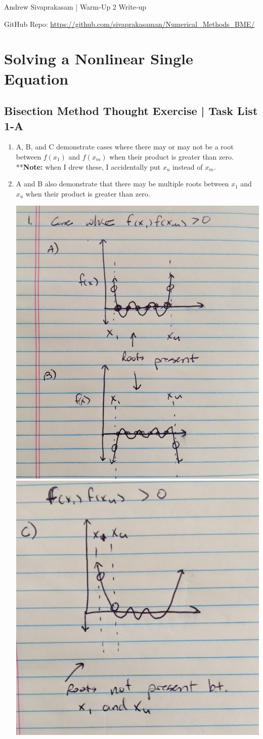 \documentclass[12pt]{extarticle}
\begin{document}
{\Large Andrew Sivaprakasam | Warm-Up 2 Write-up}

GitHub Repo: \url{https://github.com/sivaprakasaman/Numerical_Methods_BME/} 

\section{Solving a Nonlinear Single Equation}


\subsection{Bisection Method Thought Exercise | Task List 1-A}

\begin{enumerate}
\item A, B, and C demonstrate cases where there may or may not be a root between $f(x_1)$ and $f(x_m)$ when their product is greater than zero. 
**\textbf{Note:} when I drew these, I accidentally put $x_u$ instead of $x_m$.
\item A and B also demonstrate that there may be multiple roots between $x_1$ and $x_u$ when their product is greater than zero.
\\
\begin{center}
\includegraphics[width = .45\textwidth]{pic_1}
\includegraphics[width = .45\textwidth]{pic_2}
\end{center}


\end{enumerate}
\end{document}
